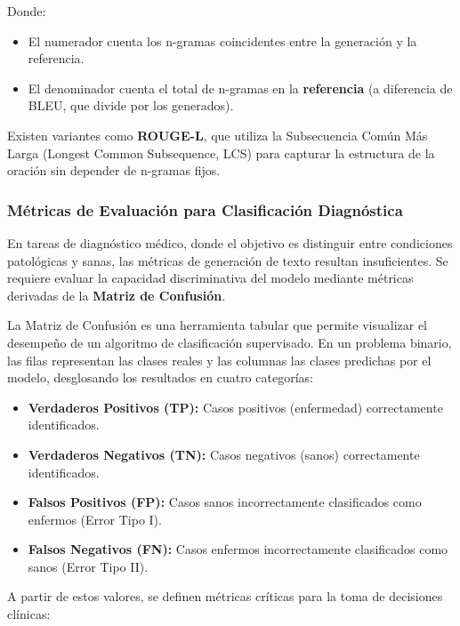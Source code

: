 \documentclass[11pt, a4paper]{article}
\begin{document}
Donde:
\begin{itemize}
    \item El numerador cuenta los n-gramas coincidentes entre la generación y la referencia.
    \item El denominador cuenta el total de n-gramas en la \textbf{referencia} (a diferencia de BLEU, que divide por los generados).
\end{itemize}
Existen variantes como \textbf{ROUGE-L}, que utiliza la Subsecuencia Común Más Larga (Longest Common Subsequence, LCS) para capturar la estructura de la oración sin depender de n-gramas fijos.

\subsubsection{Métricas de Evaluación para Clasificación Diagnóstica}

En tareas de diagnóstico médico, donde el objetivo es distinguir entre condiciones patológicas y sanas, las métricas de generación de texto resultan insuficientes. Se requiere evaluar la capacidad discriminativa del modelo mediante
métricas derivadas de la \textbf{Matriz de Confusión}.

La Matriz de Confusión es una herramienta tabular que permite visualizar el desempeño de un algoritmo de clasificación supervisado. En un problema binario, las filas representan las clases reales y las columnas las clases predichas por
el modelo, desglosando los resultados en cuatro categorías:
\begin{itemize}
    \item \textbf{Verdaderos Positivos (TP):} Casos positivos (enfermedad) correctamente identificados.
    \item \textbf{Verdaderos Negativos (TN):} Casos negativos (sanos) correctamente identificados.
    \item \textbf{Falsos Positivos (FP):} Casos sanos incorrectamente clasificados como enfermos (Error Tipo I).
    \item \textbf{Falsos Negativos (FN):} Casos enfermos incorrectamente clasificados como sanos (Error Tipo II).
\end{itemize}

A partir de estos valores, se definen métricas críticas para la toma de decisiones clínicas:
\end{document}
